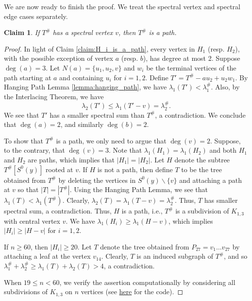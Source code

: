 \documentclass[11pt]{article}
\theoremstyle{plain}
\newtheorem{claim}{Claim}[section]
\numberwithin{equation}{section}
\begin{document}
We are now ready to finish the proof. We treat the spectral vertex and spectral edge cases separately.

\begin{claim}
    If $T^{\#}$ has a spectral vertex $v$, then $T^{\#}$ is a path.
\end{claim}

\begin{proof}

In light of Claim \ref{claim:H_i_is_a_path}, every vertex in $H_1$ (resp. $H_2$), with the possible exception of vertex $a$ (resp. $b$), has degree at most 2. Suppose $\deg(a)=3$. Let $N(a) = \{u_1, u_2, v\}$ and $w_i$ be the terminal vertices of the path starting at $a$ and containing $u_i$ for $i=1,2$. Define $T' = T^{\#} - au_2 + u_2w_1$. By Hanging Path Lemma \ref{lemma:hanging_path}, we have $\lambda_1(T')<\lambda_1^{\#}$. Also, by the Interlacing Theorem, we have 
\[ \lambda_2(T') \le \lambda_1(T'-v) = \lambda_2^{\#}.\]
We see that $T'$ has a smaller spectral sum than $T^{\#}$, a contradiction. We conclude that $\deg(a)=2$, and similarly $\deg(b)=2$.

To show that $T^{\#}$ is a path, we only need to argue that $\deg(v)=2$. Suppose, to the contrary, that $\deg(v)=3$. Note that  $\lambda_1(H_1)=\lambda_1(H_2)$ and both $H_1$ and $H_2$ are paths, which implies that $|H_1|=|H_2|$. Let $H$ denote the subtree $T^{\#}[S^0(y)]$ rooted at $v$. If $H$ is not a path, then define $T$ to be the tree obtained from $T^{\#}$ by deleting the vertices in $S^0(y)\backslash\{v\}$ and attaching a path at $v$ so that $|T| = |T^{\#}|$. Using the Hanging Path Lemma, we see that $\lambda_1(T)<\lambda_1(T^{\#})$. Clearly, $\lambda_2(T) = \lambda_1(T-v) = \lambda_2^{\#}$. Thus, $T$ has smaller spectral sum, a contradiction. Thus, $H$ is a path, i.e., $T^{\#}$ is a subdivision of $K_{1,3}$ with central vertex $v$. We have $\lambda_1(H_i)\ge \lambda_1(H-v)$, which implies $|H_i|\ge |H-v|$ for $i=1,2$. 

If $n\ge 60$, then $|H_i|\ge 20$. Let $T$ denote the tree obtained from $P_{27}=v_1\ldots v_{27}$ by attaching a leaf at the vertex $v_{14}$. Clearly, $T$ is an induced subgraph of $T^{\#}$, and so $\lambda_1^{\#} + \lambda_2^{\#}\ge \lambda_1(T) + \lambda_2(T)>4$,
a contradiction. 

When $19\le n < 60$, we verify the assertion computationally by considering all subdivisions of $K_{1,3}$ on $n$ vertices (see \href{https://github.com/Shivaramkratos/Codes_misc/blob/main/Spec_sum_minimize_check.sage}{here} for the code).
\end{proof}
\end{document}
